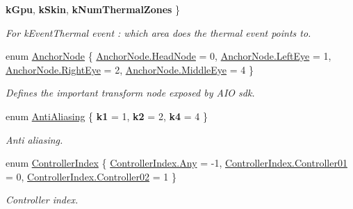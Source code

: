 \begin{DoxyCompactItemize}
{\bfseries k\+Gpu}, 
{\bfseries k\+Skin}, 
{\bfseries k\+Num\+Thermal\+Zones}
 \}
\begin{DoxyCompactList}\small\item\em For k\+Event\+Thermal event \+: which area does the thermal event points to. \end{DoxyCompactList}\item 
enum \mbox{\hyperlink{namespace_ximmerse_1_1_rhino_x_a09d608afdcafd91f4b0fb1260897d732}{Anchor\+Node}} \{ \mbox{\hyperlink{namespace_ximmerse_1_1_rhino_x_a09d608afdcafd91f4b0fb1260897d732a020b8615ef43f2e0f294d51aa84952b3}{Anchor\+Node.\+Head\+Node}} = 0, 
\mbox{\hyperlink{namespace_ximmerse_1_1_rhino_x_a09d608afdcafd91f4b0fb1260897d732abf33bb6b1088e0b535e68ad4093ef477}{Anchor\+Node.\+Left\+Eye}} = 1, 
\mbox{\hyperlink{namespace_ximmerse_1_1_rhino_x_a09d608afdcafd91f4b0fb1260897d732a8b7774b63b7308eb85c167317b85381d}{Anchor\+Node.\+Right\+Eye}} = 2, 
\mbox{\hyperlink{namespace_ximmerse_1_1_rhino_x_a09d608afdcafd91f4b0fb1260897d732a6649ad6c1143ebb415adc10b20501c21}{Anchor\+Node.\+Middle\+Eye}} = 4
 \}
\begin{DoxyCompactList}\small\item\em Defines the important transform node exposed by A\+IO sdk. \end{DoxyCompactList}\item 
enum \mbox{\hyperlink{namespace_ximmerse_1_1_rhino_x_a6f6b7e0f3b580e31040b75578bbf4c94}{Anti\+Aliasing}} \{ {\bfseries k1} = 1, 
{\bfseries k2} = 2, 
{\bfseries k4} = 4
 \}
\begin{DoxyCompactList}\small\item\em Anti aliasing. \end{DoxyCompactList}\item 
enum \mbox{\hyperlink{namespace_ximmerse_1_1_rhino_x_a78c4d1657dc299dc9f91fad0ef234666}{Controller\+Index}} \{ \mbox{\hyperlink{namespace_ximmerse_1_1_rhino_x_a78c4d1657dc299dc9f91fad0ef234666aed36a1ef76a59ee3f15180e0441188ad}{Controller\+Index.\+Any}} = -\/1, 
\mbox{\hyperlink{namespace_ximmerse_1_1_rhino_x_a78c4d1657dc299dc9f91fad0ef234666a52739a9898cd6fcdbd43edde5c2450b6}{Controller\+Index.\+Controller01}} = 0, 
\mbox{\hyperlink{namespace_ximmerse_1_1_rhino_x_a78c4d1657dc299dc9f91fad0ef234666a30ec322e17de2d80ddc78cc5f6993263}{Controller\+Index.\+Controller02}} = 1
 \}
\begin{DoxyCompactList}\small\item\em Controller index. \end{DoxyCompactList}\item 

\end{DoxyCompactItemize}
